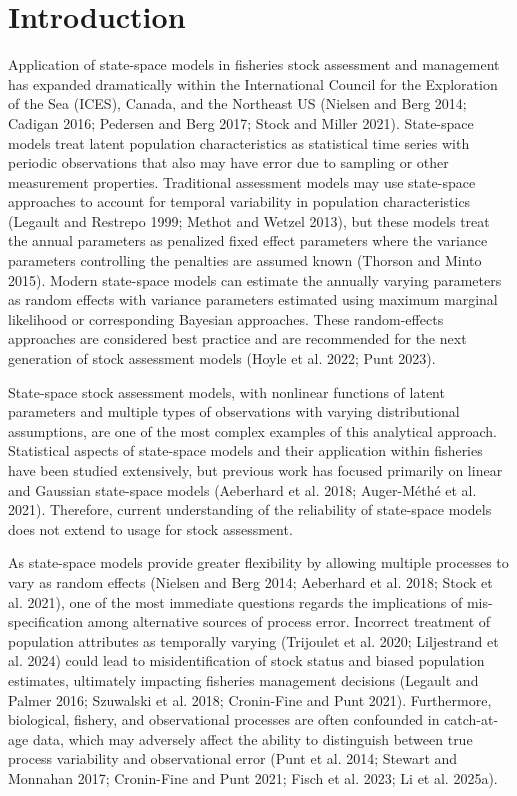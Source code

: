 \documentclass[
  12pt,
]{article}
\begin{document}
\pagebreak

\section*{Introduction}\label{introduction}

Application of state-space models in fisheries stock assessment and
management has expanded dramatically within the International Council
for the Exploration of the Sea (ICES), Canada, and the Northeast US
(Nielsen and Berg 2014; Cadigan 2016; Pedersen and Berg 2017; Stock and
Miller 2021). State-space models treat latent population characteristics
as statistical time series with periodic observations that also may have
error due to sampling or other measurement properties. Traditional
assessment models may use state-space approaches to account for temporal
variability in population characteristics (Legault and Restrepo 1999;
Methot and Wetzel 2013), but these models treat the annual parameters as
penalized fixed effect parameters where the variance parameters
controlling the penalties are assumed known (Thorson and Minto 2015).
Modern state-space models can estimate the annually varying parameters
as random effects with variance parameters estimated using maximum
marginal likelihood or corresponding Bayesian approaches. These
random-effects approaches are considered best practice and are
recommended for the next generation of stock assessment models (Hoyle et
al. 2022; Punt 2023).

State-space stock assessment models, with nonlinear functions of latent
parameters and multiple types of observations with varying
distributional assumptions, are one of the most complex examples of this
analytical approach. Statistical aspects of state-space models and their
application within fisheries have been studied extensively, but previous
work has focused primarily on linear and Gaussian state-space models
(Aeberhard et al. 2018; {Auger-Méthé et al.} 2021). Therefore, current
understanding of the reliability of state-space models does not extend
to usage for stock assessment.

As state-space models provide greater flexibility by allowing multiple
processes to vary as random effects (Nielsen and Berg 2014; Aeberhard et
al. 2018; Stock et al. 2021), one of the most immediate questions
regards the implications of mis-specification among alternative sources
of process error. Incorrect treatment of population attributes as
temporally varying (Trijoulet et al. 2020; Liljestrand et al. 2024)
could lead to misidentification of stock status and biased population
estimates, ultimately impacting fisheries management decisions (Legault
and Palmer 2016; Szuwalski et al. 2018; Cronin-Fine and Punt 2021).
Furthermore, biological, fishery, and observational processes are often
confounded in catch-at-age data, which may adversely affect the ability
to distinguish between true process variability and observational error
(Punt et al. 2014; Stewart and Monnahan 2017; Cronin-Fine and Punt 2021;
Fisch et al. 2023; Li et al. 2025a).
\end{document}
